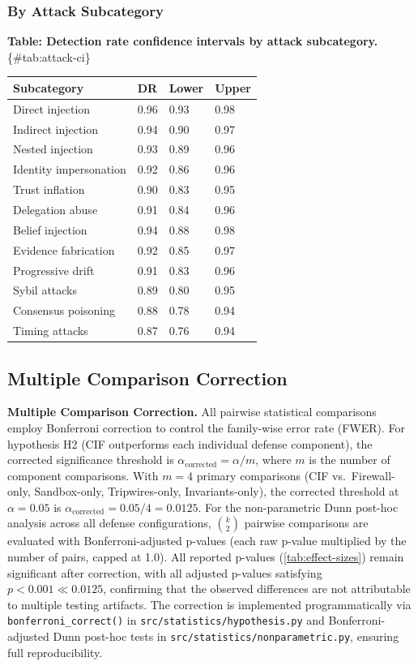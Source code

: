 \documentclass[
]{article}
\newcounter{none} %
\begin{document}
\subsubsection{By Attack Subcategory}\label{sec:attack-ci}

\textbf{Table: Detection rate confidence intervals by attack
subcategory.} \{\#tab:attack-ci\}

{\def\LTcaptype{none} %
\begin{longtable}[]{@{}llll@{}}
\toprule\noalign{}
Subcategory & DR & Lower & Upper \\
\midrule\noalign{}
\endhead
\bottomrule\noalign{}
\endlastfoot
Direct injection & 0.96 & 0.93 & 0.98 \\
Indirect injection & 0.94 & 0.90 & 0.97 \\
Nested injection & 0.93 & 0.89 & 0.96 \\
Identity impersonation & 0.92 & 0.86 & 0.96 \\
Trust inflation & 0.90 & 0.83 & 0.95 \\
Delegation abuse & 0.91 & 0.84 & 0.96 \\
Belief injection & 0.94 & 0.88 & 0.98 \\
Evidence fabrication & 0.92 & 0.85 & 0.97 \\
Progressive drift & 0.91 & 0.83 & 0.96 \\
Sybil attacks & 0.89 & 0.80 & 0.95 \\
Consensus poisoning & 0.88 & 0.78 & 0.94 \\
Timing attacks & 0.87 & 0.76 & 0.94 \\
\end{longtable}
}

\subsection{Multiple Comparison Correction}\label{sec:bonferroni}

\textbf{Multiple Comparison Correction.} All pairwise statistical
comparisons employ Bonferroni correction to control the family-wise
error rate (FWER). For hypothesis H2 (CIF outperforms each individual
defense component), the corrected significance threshold is
\(\alpha_{\text{corrected}} = \alpha / m\), where \(m\) is the number of
component comparisons. With \(m = 4\) primary comparisons (CIF
vs.~Firewall-only, Sandbox-only, Tripwires-only, Invariants-only), the
corrected threshold at \(\alpha = 0.05\) is
\(\alpha_{\text{corrected}} = 0.05 / 4 = 0.0125\). For the
non-parametric Dunn post-hoc analysis across all defense configurations,
\(\binom{k}{2}\) pairwise comparisons are evaluated with
Bonferroni-adjusted p-values (each raw p-value multiplied by the number
of pairs, capped at 1.0). All reported p-values
(\cref{tab:effect-sizes}) remain significant after correction, with all
adjusted p-values satisfying \(p < 0.001 \ll 0.0125\), confirming that
the observed differences are not attributable to multiple testing
artifacts. The correction is implemented programmatically via
\texttt{bonferroni\_correct()} in \texttt{src/statistics/hypothesis.py}
and Bonferroni-adjusted Dunn post-hoc tests in
\texttt{src/statistics/nonparametric.py}, ensuring full reproducibility.
\end{document}
